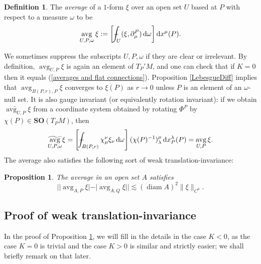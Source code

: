 \documentclass[reqno,11pt]{amsart}
\newcommand{\SpOrth}{\mathbf{SO}}
\DeclareMathOperator{\avg}{avg}
\DeclareMathOperator{\diam}{diam}
\newcommand*\dif{\mathop{}\!\mathrm{d}}
\newcommand{\dfn}[1]{\emph{#1}\index{#1}}
\newtheorem{proposition}[theorem]{Proposition}
\theoremstyle{definition}
\newtheorem{definition}[theorem]{Definition}
\numberwithin{equation}{section}
\def\Xint#1{\mathchoice
{\XXint\displaystyle\textstyle{#1}}%
{\XXint\textstyle\scriptstyle{#1}}%
{\XXint\scriptstyle\scriptscriptstyle{#1}}%
{\XXint\scriptscriptstyle\scriptscriptstyle{#1}}%
\!\int}
\def\XXint#1#2#3{{\setbox0=\hbox{$#1{#2#3}{\int}$ }
\vcenter{\hbox{$#2#3$ }}\kern-.6\wd0}}
\def\dashint{\Xint-}
\begin{document}
\begin{definition}
The \dfn{average} of a $1$-form $\xi$ over an open set $U$ based at $P$ with respect to a measure $\omega$ to be
$$\avg_{U, P, \omega} \xi := \left[\dashint_U (\xi, \partial^P_\mu) \dif \omega\right] \dif x^\mu(P).$$
\end{definition}

We sometimes suppress the subscripts $U, P, \omega$ if they are clear or irrelevant.
By definition, $\avg_{U, P} \xi$ is again an element of $T_P'M$, and one can check that if $K = 0$ then it equals (\ref{averages and flat connections}).
Proposition \ref{LebesgueDiff} implies that $\avg_{B(P, r), P} \xi$ converges to $\xi(P)$ as $r \to 0$ unless $P$ is an element of an $\omega$-null set.
It is also gauge invariant (or equivalently rotation invariant): if we obtain $\widetilde{\avg_{U, P}} \xi$ from a coordinate system obtained by rotating $\Phi^P$ by $\chi(P) \in \SpOrth(T_PM)$, then
$$\widetilde{\avg_{U, P, \omega}} \xi = \left[\dashint_{B(P, r)} \chi^\nu_\mu \xi_\nu \dif \omega\right] (\chi(P)^{-1})_\lambda^\mu \dif x^\lambda_P(P) = \avg_{U, P} \xi.$$
The average also satisfies the following sort of weak translation-invariance:

\begin{proposition}\label{translation invariance}
The average in an open set $A$ satisfies
$$||\avg_{A, P} \xi| - |\avg_{A, Q} \xi|| \lesssim (\diam A)^2 \|\xi\|_{C^0}.$$
\end{proposition}

\subsection{Proof of weak translation-invariance}
In the proof of Proposition \ref{translation invariance}, we will fill in the details in the case $K < 0$, as the case $K = 0$ is trivial and the case $K > 0$ is similar and strictly easier; we shall briefly remark on that later.
\end{document}
